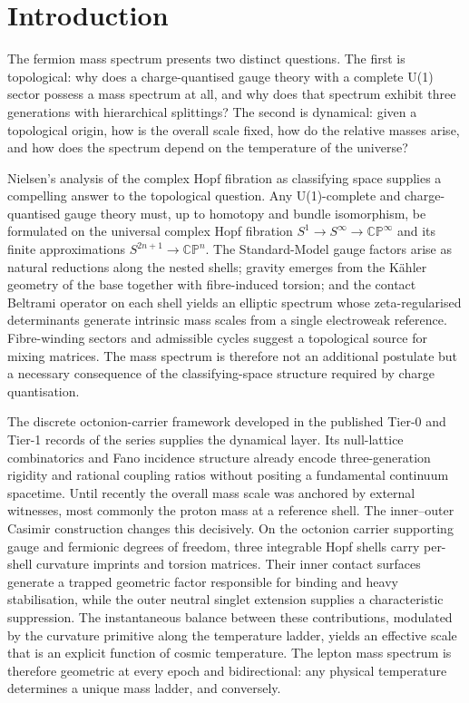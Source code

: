 \documentclass[11pt]{amsart}
\begin{document}


\section{Introduction}

The fermion mass spectrum presents two distinct questions. The first is topological: why does a charge-quantised gauge theory with a complete U(1) sector possess a mass spectrum at all, and why does that spectrum exhibit three generations with hierarchical splittings? The second is dynamical: given a topological origin, how is the overall scale fixed, how do the relative masses arise, and how does the spectrum depend on the temperature of the universe?

Nielsen's analysis of the complex Hopf fibration as classifying space \cite{NielsenTUFT2026} supplies a compelling answer to the topological question. Any U(1)-complete and charge-quantised gauge theory must, up to homotopy and bundle isomorphism, be formulated on the universal complex Hopf fibration $S^1\to S^\infty\to\mathbb{CP}^\infty$ and its finite approximations $S^{2n+1}\to\mathbb{CP}^n$. The Standard-Model gauge factors arise as natural reductions along the nested shells; gravity emerges from the Kähler geometry of the base together with fibre-induced torsion; and the contact Beltrami operator on each shell yields an elliptic spectrum whose zeta-regularised determinants generate intrinsic mass scales from a single electroweak reference. Fibre-winding sectors and admissible cycles suggest a topological source for mixing matrices. The mass spectrum is therefore not an additional postulate but a necessary consequence of the classifying-space structure required by charge quantisation.

The discrete octonion-carrier framework developed in the published Tier-0 and Tier-1 records of the series supplies the dynamical layer. Its null-lattice combinatorics and Fano incidence structure already encode three-generation rigidity and rational coupling ratios without positing a fundamental continuum spacetime. Until recently the overall mass scale was anchored by external witnesses, most commonly the proton mass at a reference shell. The inner--outer Casimir construction changes this decisively. On the octonion carrier supporting gauge and fermionic degrees of freedom, three integrable Hopf shells carry per-shell curvature imprints and torsion matrices. Their inner contact surfaces generate a trapped geometric factor responsible for binding and heavy stabilisation, while the outer neutral singlet extension supplies a characteristic suppression. The instantaneous balance between these contributions, modulated by the curvature primitive along the temperature ladder, yields an effective scale that is an explicit function of cosmic temperature. The lepton mass spectrum is therefore geometric at every epoch and bidirectional: any physical temperature determines a unique mass ladder, and conversely.
\end{document}
